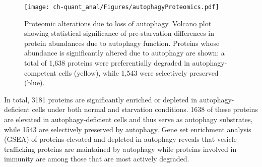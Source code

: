 \begin{figure}[h!]
\begin{center}
\texttt{[image: ch-quant\_anal/Figures/autophagyProteomics.pdf]}
\caption[Proteomic alterations due to loss of autophagy]{Proteomic alterations due to loss of autophagy. Volcano plot showing statistical significance of pre-starvation differences in protein abundances due to autophagy function. Proteins whose abundance is significantly altered due to autophagy are shown: a total of 1,638 proteins were preferentially degraded in autophagy-competent cells (yellow), while 1,543 were selectively preserved (blue).}
\label{ch-quant_anal:autophagyProteomics}
\end{center}
\end{figure}

In total, 3181 proteins are significantly enriched or depleted in autophagy-deficient cells under both normal and starvation conditions.  1638 of these proteins are elevated in autophagy-deficient cells and thus serve as autophagy substrates, while 1543 are selectively preserved by autophagy.  Gene set enrichment analysis (GSEA) of proteins elevated and depleted in autophagy reveals that vesicle trafficking proteins are maintained by autophagy while proteins involved in immunity are among those that are most actively degraded.


